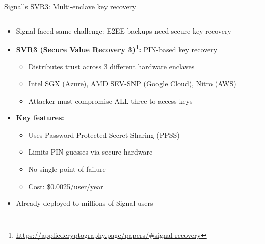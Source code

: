 \documentclass[aspectratio=169, lualatex, handout]{beamer}
\begin{document}
\begin{frame}{Signal's SVR3: Multi-enclave key recovery}
	\begin{columns}[c]
		\begin{column}{1\textwidth}
			\begin{itemize}
				\item Signal faced same challenge: E2EE backups need secure key recovery
				\item \textbf{SVR3 (Secure Value Recovery 3)\footnote{\url{https://appliedcryptography.page/papers/\#signal-recovery}}:} PIN-based key recovery
				      \begin{itemize}
					      \item Distributes trust across 3 different hardware enclaves
					      \item Intel SGX (Azure), AMD SEV-SNP (Google Cloud), Nitro (AWS)
					      \item Attacker must compromise ALL three to access keys
				      \end{itemize}
				\item \textbf{Key features:}
				      \begin{itemize}
					      \item Uses Password Protected Secret Sharing (PPSS)
					      \item Limits PIN guesses via secure hardware
					      \item No single point of failure
					      \item Cost: \$0.0025/user/year
				      \end{itemize}
				\item Already deployed to millions of Signal users
			\end{itemize}
		\end{column}
	\end{columns}
\end{frame}
\end{document}
